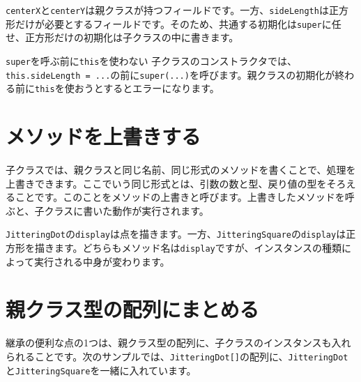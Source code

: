 \texttt{centerX}と\texttt{centerY}は親クラスが持つフィールドです。一方、\texttt{sideLength}は正方形だけが必要とするフィールドです。そのため、共通する初期化は\texttt{super}に任せ、正方形だけの初期化は子クラスの中に書きます。

\begin{mistakebox}{\texttt{super}を呼ぶ前に\texttt{this}を使わない}
子クラスのコンストラクタでは、\texttt{this.sideLength = ...}の前に\texttt{super(...)}を呼びます。親クラスの初期化が終わる前に\texttt{this}を使おうとするとエラーになります。
\end{mistakebox}

\section{メソッドを上書きする}

子クラスでは、親クラスと同じ名前、同じ形式のメソッドを書くことで、処理を上書きできます。ここでいう同じ形式とは、引数の数と型、戻り値の型をそろえることです。このことをメソッドの上書きと呼びます。上書きしたメソッドを呼ぶと、子クラスに書いた動作が実行されます。

\texttt{JitteringDot}の\texttt{display}は点を描きます。一方、\texttt{JitteringSquare}の\texttt{display}は正方形を描きます。どちらもメソッド名は\texttt{display}ですが、インスタンスの種類によって実行される中身が変わります。

\section{親クラス型の配列にまとめる}

継承の便利な点の1つは、親クラス型の配列に、子クラスのインスタンスも入れられることです。次のサンプルでは、\texttt{JitteringDot[]}の配列に、\texttt{JitteringDot}と\texttt{JitteringSquare}を一緒に入れています。

\begin{listing}[htbp]
\inputminted[firstline=1,lastline=43]{ts}{typescript-p5/listings/chapter14/jittering-mixed-array.ts}
\caption{点と正方形で共通する親クラス（\texttt{chapter14/jittering-mixed-array.ts}）}
\label{lst:chapter14-jittering-mixed-array-classes}
\end{listing}

\begin{listing}[htbp]
\inputminted[firstline=45,lastline=67]{ts}{typescript-p5/listings/chapter14/jittering-mixed-array.ts}
\caption{親クラス型の配列でまとめて動かす（\texttt{chapter14/jittering-mixed-array.ts}）}
\label{lst:chapter14-jittering-mixed-array-sketch}
\end{listing}

